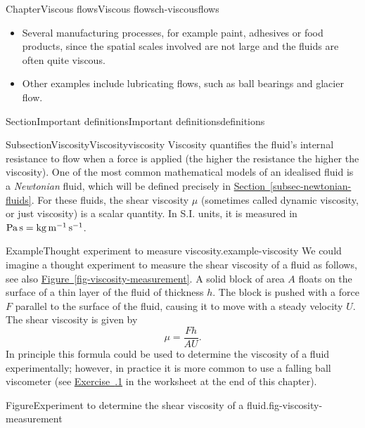 \documentclass[oneside,10pt,]{book}
\newcommand{\xreffont}{\relax}
\numberwithin{equation}{section}
\begin{document}
\begin{chapterptx}{Chapter}{Viscous flows}{}{Viscous flows}{}{}{ch-viscousflows}
\begin{introduction}{}
\begin{itemize}[label=\textbullet]
\item{}Several manufacturing processes, for example paint, adhesives or food products, since the spatial scales involved are not large and the fluids are often quite viscous.%
\item{}Other examples include lubricating flows, such as ball bearings and glacier flow.%
\end{itemize}
%
\end{introduction}%
%
%
\typeout{************************************************}
\typeout{************************************************}
%
\begin{sectionptx}{Section}{Important definitions}{}{Important definitions}{}{}{definitions}
%
%
\typeout{************************************************}
\typeout{************************************************}
%
\begin{subsectionptx}{Subsection}{Viscosity}{}{Viscosity}{}{}{viscosity}
Viscosity quantifies the fluid's internal resistance to flow when a force is applied (the higher the resistance the higher the viscosity). One of the most common mathematical models of an idealised fluid is a \emph{Newtonian} fluid, which will be defined precisely in \hyperref[subsec-newtonian-fluids]{Section~{\xreffont\ref{subsec-newtonian-fluids}}}. For these fluids, the shear viscosity \(\mu\) (sometimes called dynamic viscosity, or just viscosity) is a scalar quantity. In S.I. units, it is measured in \(\textrm{Pa\,s} = \mathrm{kg\,m^{-1}\,s^{-1}}\).%
\begin{example}{Example}{Thought experiment to measure viscosity.}{example-viscosity}%
We could imagine a thought experiment to measure the shear viscosity of a fluid as follows, see also \hyperref[fig-viscosity-measurement]{Figure~{\xreffont\ref{fig-viscosity-measurement}}}. A solid block of area \(A\) floats on the surface of a thin layer of the fluid of thickness \(h\). The block is pushed with a force \(F\) parallel to the surface of the fluid, causing it to move with a steady velocity \(U\). The shear viscosity is given by%
\begin{equation*}
\mu = \frac{F h}{A U}.
\end{equation*}
In principle this formula could be used to determine the viscosity of a fluid experimentally; however, in practice it is more common to use a falling ball viscometer (see \hyperlink{ps-falling-ball-viscometer}{Exercise~{\xreffont 7.6.1}} in the worksheet at the end of this chapter).%
\begin{figureptx}{Figure}{Experiment to determine the shear viscosity of a fluid.}{fig-viscosity-measurement}{}%

\end{figureptx}
\end{example}
\end{subsectionptx}
\end{sectionptx}
\end{chapterptx}
\end{document}
